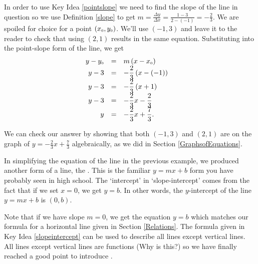 {
In order to use Key Idea \ref{pointslope} we need to find the slope of the line in question so we use Definition \ref{slope} to get $m = \frac{\Delta y}{\Delta x} = \frac{1 - 3}{2 - (-1)} = -\frac{2}{3}$.  We are spoiled for choice for a point $\left(x_{\mbox{\tiny$0$}}, y_{\mbox{\tiny$0$}}\right)$. We'll use $(-1,3)$ and leave it to the reader to check that using $(2,1)$ results in the same equation.  Substituting into the point-slope form of the line, we get 
\setlength{\extrarowheight}{10pt}
\[\begin{array}{rclr} 
y - y_{\mbox{\tiny$0$}} & = & m\left(x - x_{\mbox{\tiny$0$}}\right)  & \\
y - 3 & = & -\dfrac{2}{3} \left(x - (-1)\right) & \\
y - 3 & = & -\dfrac{2}{3} \left(x +1 \right) & \\
y - 3& = & -\dfrac{2}{3}x - \dfrac{2}{3}\\
y & = & -\dfrac{2}{3} x + \dfrac{7}{3}. \\ 
\end{array} \]

\setlength{\extrarowheight}{2pt}

We can check our answer by showing that both $(-1,3)$ and $(2,1)$ are on the graph of $y  =  -\frac{2}{3} x + \frac{7}{3}$ algebraically, as we did in Section \ref{GraphsofEquations}.
}

\medskip

In simplifying the equation of the line in the previous example, we produced another form of a line, the .  This is the familiar $y = mx + b$ form you have probably seen in high school. The `intercept' in `slope-intercept' comes from the fact that if we set $x=0$, we get $y = b$.  In other words, the $y$-intercept of the line $y = mx + b$ is $(0,b)$.

\smallskip


\smallskip

Note that if we have slope $m = 0$, we get the equation $y = b$ which matches our formula for a horizontal line given in Section \ref{Relations}.  The formula given in Key Idea \ref{slopeintercept} can be used to describe all lines except vertical lines.  All lines except vertical lines are functions (Why is this?) so we have finally reached a good point to introduce .

